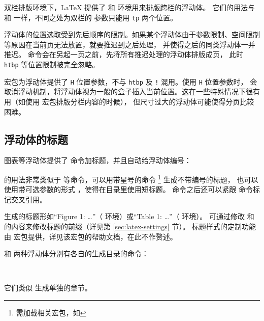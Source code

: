 双栏排版环境下，\LaTeX{} 提供了  和  环境用来排版跨栏的浮动体。
它们的用法与  和  一样，不同之处为双栏的  参数只能用 \texttt{tp} 两个位置。

浮动体的位置选取受到先后顺序的限制。如果某个浮动体由于参数限制、空间限制等原因在当前页无法放置，就要推迟到之后处理，
并使得之后的同类浮动体一并推迟。 命令会在另起一页之前，先将所有推迟处理的浮动体排版成页，
此时 \texttt{htbp} 等位置限制被完全忽略。


 宏包为浮动体提供了 \texttt{H} 位置参数，不与 \texttt{htbp} 及 \texttt{!} 混用。使用 \texttt{H} 位置参数时，
会取消浮动机制，将浮动体视为一般的盒子插入当前位置。这在一些特殊情况下很有用（如使用  宏包排版分栏内容的时候），
但尺寸过大的浮动体可能使得分页比较困难。

\subsection{浮动体的标题}\label{subsec:caption}

图表等浮动体提供了  命令加标题，并且自动给浮动体编号：
\begin{command}
\marg*{\ldots}
\end{command}
 的用法非常类似于  等命令，可以用带星号的命令 \footnote{需加载相关宏包，如 } 生成不带编号的标题，
也可以使用带可选参数的形式 \oarg*{\ldots}\marg*{\ldots}，使得在目录里使用短标题。
 命令之后还可以紧跟  命令标记交叉引用。

 生成的标题形如“Figure 1: \ldots”（ 环境）或“Table 1: \ldots”（ 环境）。
可通过修改  和  的内容来修改标题的前缀（详见第 \ref{sec:latex-settings} 节）。
标题样式的定制功能由  宏包提供，详见该宏包的帮助文档，在此不作赘述。

 和  两种浮动体分别有各自的生成目录的命令：
\begin{command}
 \\
\end{command}

它们类似  生成单独的章节。

